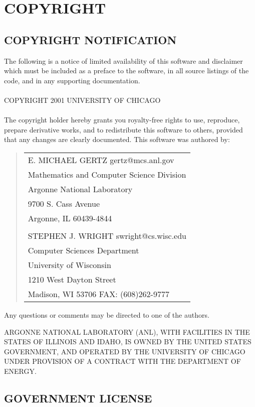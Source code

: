 \section{COPYRIGHT}%

\subsection*{COPYRIGHT NOTIFICATION}%

The following is a notice of limited availability of this software and
disclaimer which must be included as a preface to the software, in all
source listings of the code, and in any supporting documentation.
\\ \\
COPYRIGHT 2001 UNIVERSITY OF CHICAGO
\\ \\
The copyright holder hereby grants you royalty-free rights to use,
reproduce, prepare derivative works, and to redistribute this software
to others, provided that any changes are clearly documented.  This
software was authored by:
\begin{quote}
\begin{tabular}{l}
    E. MICHAEL GERTZ      gertz@mcs.anl.gov \\
    Mathematics and Computer Science Division \\
    Argonne National Laboratory \\
    9700 S. Cass Avenue \\
    Argonne, IL 60439-4844 \\ \\

    STEPHEN J. WRIGHT     swright@cs.wisc.edu \\
    Computer Sciences Department \\
    University of Wisconsin \\
    1210 West Dayton Street \\
    Madison, WI 53706   FAX: (608)262-9777 
\end{tabular}
\end{quote}
Any questions or comments may be directed to one of the authors.

ARGONNE NATIONAL LABORATORY (ANL), WITH FACILITIES IN THE STATES OF
ILLINOIS AND IDAHO, IS OWNED BY THE UNITED STATES GOVERNMENT, AND
OPERATED BY THE UNIVERSITY OF CHICAGO UNDER PROVISION OF A CONTRACT
WITH THE DEPARTMENT OF ENERGY.

\subsection*{GOVERNMENT LICENSE}%

